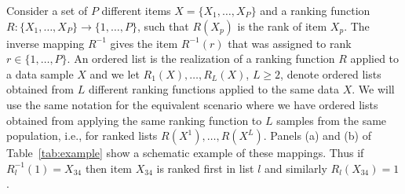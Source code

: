 \documentclass[12pt,a4paper]{article}
\theoremstyle{plain}
\begin{document}
Consider a set of $P$ different items $X=\{X_1,\dots,X_P\}$ and a
ranking function $R: \{X_1,\dots,X_P\}\to \{1,\dots,P\}$, such that
$R(X_p)$ is the rank of item $X_p$. The inverse mapping $R^{-1}$ gives
the item $R^{-1}(r)$ that was assigned to rank $r\in\{1,\dots,P\}$. An
ordered list is the realization of a ranking function $R$ applied to a
data sample $X$ and we let $R_1(X),\dots,R_L(X)$, $L\geq2$, denote
ordered lists obtained from $L$ different ranking functions applied to
the same data $X$. We will use the same notation for the equivalent
scenario where we have ordered lists obtained from applying the same
ranking function to $L$ samples from the same population, i.e., for
ranked lists $R(X^1), \ldots, R(X^L)$.  Panels (a) and (b) of
Table~\ref{tab:example} show a schematic example of these
mappings. Thus if $R_l^{-1}(1)=X_{34}$ then item $X_{34}$ is ranked
first in list $l$ and similarly $R_l(X_{34})=1$.
\end{document}
